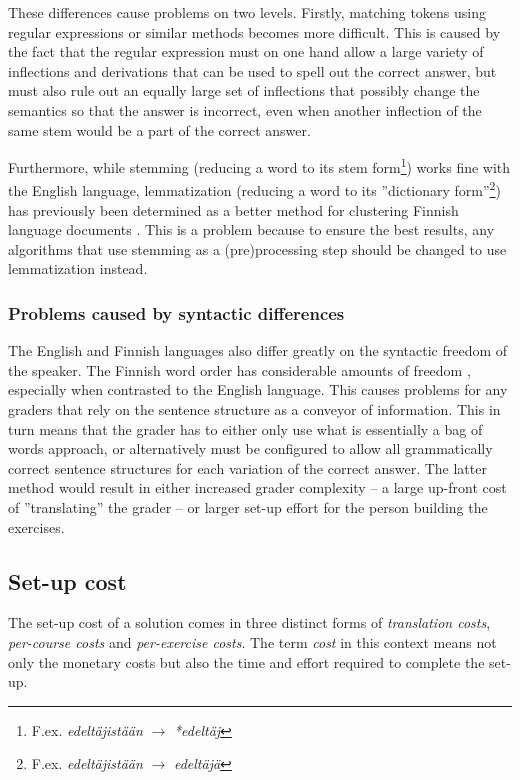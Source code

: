 \documentclass[english]{tktltiki2}
\theoremstyle{definition}
\theoremstyle{remark}
\begin{document}
These differences cause problems on two levels. Firstly, matching tokens using regular expressions or similar methods becomes more difficult. This is caused by the fact that the regular expression must on one hand allow a large variety of inflections and derivations that can be used to spell out the correct answer, but must also rule out an equally large set of inflections that possibly change the semantics so that the answer is incorrect, even when another inflection of the same stem would be a part of the correct answer.

Furthermore, while stemming (reducing a word to its stem form\footnote{F.ex. \emph{edeltäjistään} $\rightarrow$ \emph{*edeltäj}}) works fine with the English language, lemmatization (reducing a word to its ''dictionary form''\footnote{F.ex. \emph{edeltäjistään} $\rightarrow$ \emph{edeltäjä}}) has previously been determined as a better method for clustering Finnish language documents \cite{korenius04}. This is a problem because to ensure the best results, any algorithms that use stemming as a (pre)processing step should be changed to use lemmatization instead.

\subsubsection{Problems caused by syntactic differences}

The English and Finnish languages also differ greatly on the syntactic freedom of the speaker. The Finnish word order has considerable amounts of freedom \cite{karttunen85}, especially when contrasted to the English language. This causes problems for any graders that rely on the sentence structure as a conveyor of information. This in turn means that the grader has to either only use what is essentially a bag of words approach, or alternatively must be configured to allow all grammatically correct sentence structures for each variation of the correct answer. The latter method would result in either increased grader complexity -- a large up-front cost of ''translating'' the grader -- or larger set-up effort for the person building the exercises.

\subsection{Set-up cost}
\label{sec:set-up-cost}

The set-up cost of a solution comes in three distinct forms of \emph{translation costs}, \emph{per-course costs} and \emph{per-exercise costs}. The term \emph{cost} in this context means not only the monetary costs but also the time and effort required to complete the set-up.
\end{document}
